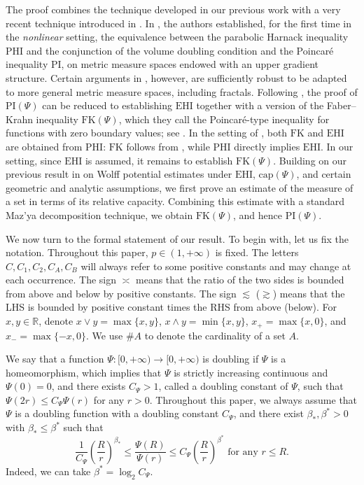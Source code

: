 \documentclass[11pt,a4paper]{article}
\numberwithin{equation}{section}
\theoremstyle{plain}
\theoremstyle{definition}
\begin{document}
The proof combines the technique developed in our previous work \cite{Yan25d} with a very recent technique introduced in \cite{EK26}. In \cite{EK26}, the authors established, for the first time in the \emph{nonlinear} setting, the equivalence between the parabolic Harnack inequality $\text{PHI}$ and the conjunction of the volume doubling condition and the Poincar\'e inequality $\text{PI}$, on metric measure spaces endowed with an upper gradient structure. Certain arguments in \cite{EK26}, however, are sufficiently robust to be adapted to more general metric measure spaces, including fractals. Following \cite[Lemmas 2.5 and 7.5, Theorem 7.6]{EK26}, the proof of $\text{PI}(\Psi)$ can be reduced to establishing $\text{EHI}$ together with a version of the Faber--Krahn inequality $\text{FK}(\Psi)$, which they call the Poincar\'e-type inequality for functions with zero boundary values; see \cite[(7.1), (7.10)]{EK26}. In the setting of \cite{EK26}, both $\text{FK}$ and $\text{EHI}$ are obtained from $\text{PHI}$: $\text{FK}$ follows from \cite[Proposition 7.1]{EK26}, while $\text{PHI}$ directly implies $\text{EHI}$. In our setting, since $\text{EHI}$ is assumed, it remains to establish $\text{FK}(\Psi)$. Building on our previous result in \cite{Yan25d} on Wolff potential estimates under $\text{EHI}$, $\text{cap}(\Psi)$, and certain geometric and analytic assumptions, we first prove an estimate of the measure of a set in terms of its relative capacity. Combining this estimate with a standard Maz'ya decomposition technique, we obtain $\text{FK}(\Psi)$, and hence $\text{PI}(\Psi)$.

We now turn to the formal statement of our result. To begin with, let us fix the notation. Throughout this paper, $p\in(1,+\infty)$ is fixed. The letters $C,C_1,C_2,C_A, C_B$ will always refer to some positive constants and may change at each occurrence. The sign $\asymp$ means that the ratio of the two sides is bounded from above and below by positive constants. The sign $\lesssim$ ($\gtrsim$) means that the LHS is bounded by positive constant times the RHS from above (below). For $x,y\in \mathbb{R}$, denote $x\vee y=\max\{x,y\}$, $x\wedge y=\min\{x,y\}$, $x_+=\max\{x,0\}$, and $x_-=\max\{-x,0\}$. We use $\# A$ to denote the cardinality of a set $A$.

We say that a function $\Psi:[0,+\infty)\to[0,+\infty)$ is doubling if $\Psi$ is a homeomorphism, which implies that $\Psi$ is strictly increasing continuous and $\Psi(0)=0$, and there exists $C_\Psi>1$, called a doubling constant of $\Psi$, such that $\Psi(2r)\le C_\Psi\Psi(r)$ for any $r>0$. Throughout this paper, we always assume that $\Psi$ is a doubling function with a doubling constant $C_\Psi$, and there exist $\beta_*, \beta^*>0$ with $\beta_*\le\beta^*$ such that
$$\frac{1}{C_\Psi}\left(\frac{R}{r}\right)^{\beta_*}\le \frac{\Psi(R)}{\Psi(r)}\le C_{\Psi}\left(\frac{R}{r}\right)^{\beta^*}\text{ for any }r\le R.$$
Indeed, we can take $\beta^*=\log_2C_\Psi$.
\end{document}
